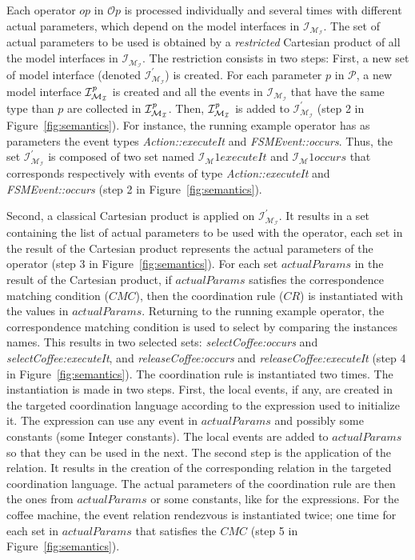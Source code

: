 Each operator $op$ in $\mathcal{O}p$ is processed individually and several times with different actual parameters, which depend on the model interfaces in $\mathcal{I_{M_I}}$. The set of actual parameters to be used is obtained by a \emph{restricted} Cartesian product of all the model interfaces in $\mathcal{I_{M_I}}$. The restriction consists in two steps: First, a new set of model interface (denoted $\mathcal{I^{'}_{M_I}}$) is created. For each parameter $p$ in $\mathcal{P}$, a new model interface $\mathcal{I^{\textit{\text{p}}}_{M_I}}$ is created and all the events in $\mathcal{I_{M_I}}$ that have the same type than $p$ are collected in $\mathcal{I^{\textit{\text{p}}}_{M_I}}$. Then, $\mathcal{I^{\textit{\text{p}}}_{M_I}}$ is added to $\mathcal{I^{'}_{M_I}}$ (step 2 in Figure~\ref{fig:semantics}). For instance, the running example operator has as parameters the event types \emph{Action::executeIt} and \emph{FSMEvent::occurs}. Thus, the set $\mathcal{I^{'}_{M_I}}$ is composed of two set named $\mathcal{I_M}{1}{executeIt}$ and $\mathcal{I_M}{1}{occurs}$ that corresponds respectively with events of type \emph{Action::executeIt} and \emph{FSMEvent::occurs} (step 2 in Figure~\ref{fig:semantics}).
%

Second, a classical Cartesian product is applied on $\mathcal{I^{'}_{M_I}}$. It results in a set containing the list of actual parameters to be used with the operator, \ie each set in the result of the Cartesian product represents the actual parameters of the operator (step 3 in Figure~\ref{fig:semantics}). For each set $actualParams$ in the result of the Cartesian product, if $actualParams$ satisfies the correspondence matching condition ($CMC$), then the coordination rule ($CR$) is instantiated with the values in $actualParams$. Returning to the running example operator, the correspondence matching condition is used to select \mse by comparing the instances names. This results in two selected sets: \emph{selectCoffee:occurs} and \emph{selectCoffee:executeIt}, and  \emph{releaseCoffee:occurs} and \emph{releaseCoffee:executeIt} (step 4 in Figure~\ref{fig:semantics}). The coordination rule is instantiated two times. The instantiation is made in two steps. First, the local events, if any, are created in the targeted coordination language according to the expression used to initialize it. The expression can use any event in $actualParams$ and possibly some constants (\eg some Integer constants). The local events are added to $actualParams$ so that they can be used in the next. The second step is the application of the relation. It results in the creation of the corresponding relation in the targeted coordination language. The actual parameters of the coordination rule are then the ones from $actualParams$ or some constants, like for the expressions. For the coffee machine, the event relation rendezvous is instantiated twice; one time for each set in $actualParams$ that satisfies the $CMC$ (step 5 in Figure~\ref{fig:semantics}).

